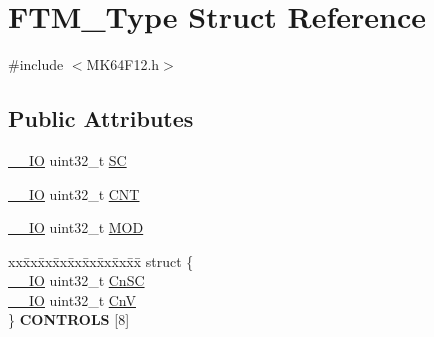 \hypertarget{structFTM__Type}{}\section{F\+T\+M\+\_\+\+Type Struct Reference}
\label{structFTM__Type}


{\ttfamily \#include $<$M\+K64\+F12.\+h$>$}

\subsection*{Public Attributes}
\begin{DoxyCompactItemize}
\item 
\hyperlink{core__sc300_8h_aec43007d9998a0a0e01faede4133d6be}{\+\_\+\+\_\+\+IO} uint32\+\_\+t \hyperlink{structFTM__Type_a539e171615dd7eccfd0c9c4f78c895ab}{SC}
\item 
\hyperlink{core__sc300_8h_aec43007d9998a0a0e01faede4133d6be}{\+\_\+\+\_\+\+IO} uint32\+\_\+t \hyperlink{structFTM__Type_aafebc28d2a0aa309a2e6eb71cc646c1b}{C\+NT}
\item 
\hyperlink{core__sc300_8h_aec43007d9998a0a0e01faede4133d6be}{\+\_\+\+\_\+\+IO} uint32\+\_\+t \hyperlink{structFTM__Type_aeb4a6a58257ebece333d61778bde756c}{M\+OD}
\item 
\begin{tabbing}
xx\=xx\=xx\=xx\=xx\=xx\=xx\=xx\=xx\=\kill
struct \{\\
\>\hyperlink{core__sc300_8h_aec43007d9998a0a0e01faede4133d6be}{\_\_IO} uint32\_t \hyperlink{structFTM__Type_a1f30106e7fbc8f5a00b586ddfcfe113a}{CnSC}\\
\>\hyperlink{core__sc300_8h_aec43007d9998a0a0e01faede4133d6be}{\_\_IO} uint32\_t \hyperlink{structFTM__Type_a4a374e850fc48c7559277888b350539c}{CnV}\\
\} {\bfseries CONTROLS} \mbox{[}8\mbox{]}\hypertarget{structFTM__Type_a5e727e24a25e332b7e80925be452fdd0}{}\label{structFTM__Type_a5e727e24a25e332b7e80925be452fdd0}
\\


\end{tabbing}
\end{DoxyCompactItemize}
